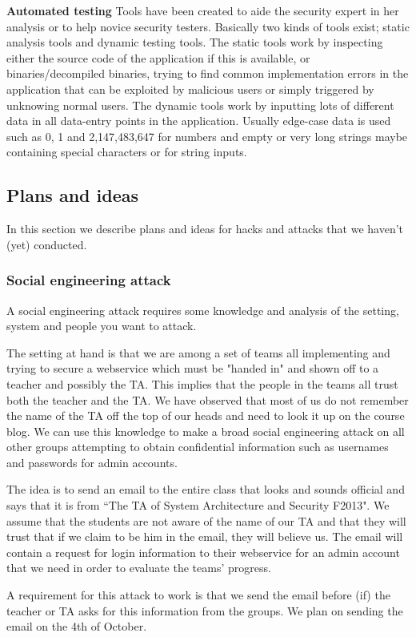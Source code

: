 \documentclass[a4paper]{article}
\begin{document}
\textbf{Automated testing}
Tools have been created to aide the security expert in her analysis or to help novice security testers. Basically two kinds of tools exist; static analysis tools and dynamic testing tools.
The static tools work by inspecting either the source code of the application if this is available, or binaries/decompiled binaries, trying to find common implementation errors in the application that can be exploited by malicious users or simply triggered by unknowing normal users.
The dynamic tools work by inputting lots of different data in all data-entry points in the application. Usually edge-case data is used such as 0, 1 and 2,147,483,647 for numbers and empty or very long strings maybe containing special characters or for string inputs.

\subsection{Plans and ideas}
In this section we describe plans and ideas for hacks and attacks that we haven't (yet) conducted.
\subsubsection{Social engineering attack}
A social engineering attack requires some knowledge and analysis of the setting, system and people you want to attack.

The setting at hand is that we are among a set of teams all implementing and trying to secure a webservice which must be "handed in" and shown off to a teacher and possibly the TA. This implies that the people in the teams all trust both the teacher and the TA. We have observed that most of us do not remember the name of the TA off the top of our heads and need to look it up on the course blog.
We can use this knowledge to make a broad social engineering attack on all other groups attempting to obtain confidential information such as usernames and passwords for admin accounts.

The idea is to send an email to the entire class that looks and sounds official and says that it is from ``The TA of System Architecture and Security F2013". We assume that the students are not aware of the name of our TA and that they will trust that if we claim to be him in the email, they will believe us. The email will contain a request for login information to their webservice for an admin account that we need in order to evaluate the teams' progress.

A requirement for this attack to work is that we send the email before (if) the teacher or TA asks for this information from the groups. We plan on sending the email on the 4th of October.
\end{document}
